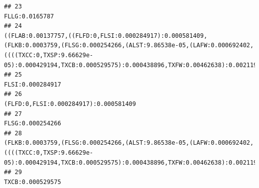 \documentclass[]{article}
\begin{document}
\begin{verbatim}
## 23                                                                                                                                                                                                                                                                                                                                                                                                                    FLLG:0.0165787
## 24                                                               ((FLAB:0.00137757,((FLFD:0,FLSI:0.000284917):0.000581409,(FLKB:0.0003759,(FLSG:0.000254266,(ALST:9.86538e-05,(LAFW:0.000692402,((((TXCC:0,TXSP:9.66629e-05):0.000429194,TXCB:0.000529575):0.000438896,TXFW:0.00462638):0.0021191,ALFW:0.000685147):0.000263869):0.00044979):0.00272304):0.000116498):0.000251601):0.00159115):0.0103898,FLLG:0.0165787):0.000403984
## 25                                                                                                                                                                                                                                                                                                                                                                                                                  FLSI:0.000284917
## 26                                                                                                                                                                                                                                                                                                                                                                                             (FLFD:0,FLSI:0.000284917):0.000581409
## 27                                                                                                                                                                                                                                                                                                                                                                                                                  FLSG:0.000254266
## 28                                                                                                                                                                           (FLKB:0.0003759,(FLSG:0.000254266,(ALST:9.86538e-05,(LAFW:0.000692402,((((TXCC:0,TXSP:9.66629e-05):0.000429194,TXCB:0.000529575):0.000438896,TXFW:0.00462638):0.0021191,ALFW:0.000685147):0.000263869):0.00044979):0.00272304):0.000116498):0.000251601
## 29                                                                                                                                                                                                                                                                                                                                                                                                                  TXCB:0.000529575

\end{verbatim}
\end{document}
